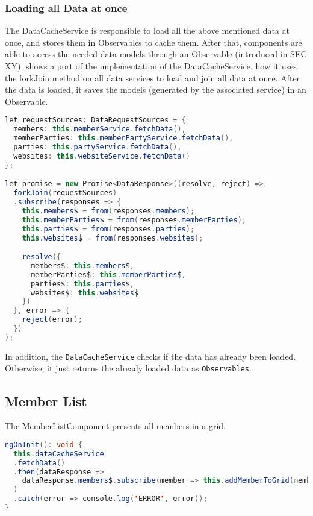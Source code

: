 \subsubsection{Loading all Data at once}\label{subsubsec:02_impl_data_loadingAll}
The DataCacheService is responsible to load all the above mentioned data at once, and stores them in Observables to cache them.
After that, components are able to access the needed data models through an Observable (introduced in SEC XY).
 shows a port of the implementation of the DataCacheService, how it uses the forkJoin method on all data services to load and join all data at once. After the data is loaded, it saves the models (generated by the associated service) in an Observable.
\begin{lstlisting}[label=lst:02_impl_data_dataserviceloading, caption=\texttt{MemberService} implementation, language=java]
let requestSources: DataRequestSources = {
  members: this.memberService.fetchData(),
  memberParties: this.memberPartyService.fetchData(),
  parties: this.partyService.fetchData(),
  websites: this.websiteService.fetchData()
};

let promise = new Promise<DataResponse>((resolve, reject) =>
  forkJoin(requestSources)
  .subscribe(responses => {
    this.members$ = from(responses.members);
    this.memberParties$ = from(responses.memberParties);
    this.parties$ = from(responses.parties);
    this.websites$ = from(responses.websites);

    resolve({
      members$: this.members$,
      memberParties$: this.memberParties$,
      parties$: this.parties$,
      websites$: this.websites$
    })
  }, error => {
    reject(error);
  })
);
\end{lstlisting}

In addition, the \texttt{DataCacheService} checks if the data has already been loaded. Otherwise, it just returns the already loaded data as \texttt{Observables}.


\subsection{Member List}\label{subsec:02_impl_memberlist}
The MemberListComponent presents all members in a grid.

\begin{lstlisting}[label=lst:02_impl_memberlist_ngoninit, caption=\texttt{MemberService} implementation, language=java]
ngOnInit(): void {
  this.dataCacheService
  .fetchData()
  .then(dataResponse =>
    dataResponse.members$.subscribe(member => this.addMemberToGrid(member))
  )
  .catch(error => console.log('ERROR', error));
}
\end{lstlisting}

